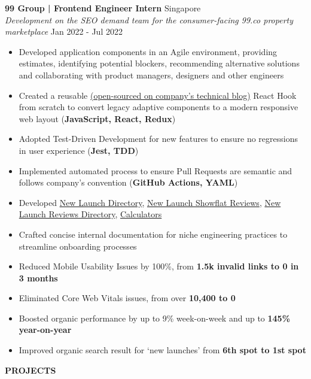 \documentclass[a4paper]{article}
\newcommand{\lineunder} {
    \vspace*{-8pt} \\
    \hspace*{-12pt} \hrulefill \\
}
\newcommand{\header} [1] {
    {\hspace*{-12pt}\vspace*{6pt} \large\textbf{#1}}
    \vspace*{-6pt} \lineunder
}
\begin{document}
\textbf{99 Group | Frontend Engineer Intern} \hfill Singapore\\
\textit{Development on the SEO demand team for the consumer-facing 99.co property marketplace} \hfill Jan 2022 - Jul 2022\\
\vspace{-2mm}
\begin{itemize} \itemsep 1pt
    \item Developed application components in an Agile environment, providing estimates, identifying potential blockers, recommending alternative solutions and collaborating with product managers, designers and other engineers
	\item Created a reusable \href{https://medium.com/99dotco/adaptive-to-responsive-in-1-react-hook-4d1ce93e1488}{(open-sourced on company's technical blog)} React Hook from scratch to convert legacy adaptive components to a modern responsive web layout (\textbf{JavaScript, React, Redux})
	\item Adopted Test-Driven Development for new features to ensure no regressions in user experience (\textbf{Jest, TDD})
	\item Implemented automated process to ensure Pull Requests are semantic and follows company’s convention (\textbf{GitHub Actions, YAML})
	\item Developed \href{https://www.99.co/singapore/new-launches}{New Launch Directory}, \href{https://www.99.co/singapore/condos-apartments/reviews/liv-mb}{New Launch Showflat Reviews}, \href{https://www.99.co/singapore/condos-apartments/reviews}{New Launch Reviews Directory}, \href{https://www.99.co/singapore/tools/tdsr-calculator}{Calculators}
	\item Crafted concise internal documentation for niche engineering practices to streamline onboarding processes
	\item Reduced Mobile Usability Issues by 100\%, from \textbf{1.5k invalid links to 0 in 3 months}
	\item Eliminated Core Web Vitals issues, from over \textbf{10,400 to 0}
	\item Boosted organic performance by up to 9\% week-on-week and up to \textbf{145\% year-on-year}
	\item Improved organic search result for ‘new launches’ from \textbf{6th spot to 1st spot}
\end{itemize}

\header{PROJECTS}
\vspace{1mm}
\end{document}
